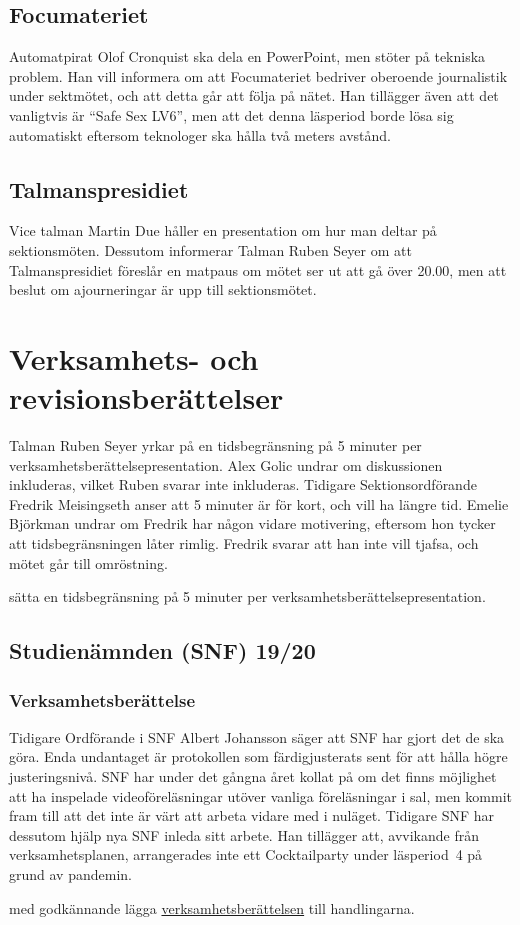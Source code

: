 \documentclass[hidelinks]{sektionsmote}
\begin{document}
\subsection{Focumateriet}
Automatpirat Olof Cronquist ska dela en PowerPoint, men stöter på tekniska problem.
Han vill informera om att Focumateriet bedriver oberoende journalistik under sektmötet, och att detta går att följa på nätet.
Han tillägger även att det vanligtvis är \enquote{Safe Sex LV6}, men att det denna läsperiod borde lösa sig automatiskt eftersom teknologer ska hålla två meters avstånd.

\subsection{Talmanspresidiet}
Vice talman Martin Due håller en presentation om hur man deltar på sektionsmöten.
Dessutom informerar Talman Ruben Seyer om att Talmanspresidiet föreslår en matpaus om mötet ser ut att gå över 20.00, men att beslut om ajourneringar är upp till sektionsmötet.


\section{Verksamhets- och revisionsberättelser}
Talman Ruben Seyer yrkar på en tidsbegränsning på 5 minuter per verksamhetsberättelsepresentation.
Alex Golic undrar om diskussionen inkluderas, vilket Ruben svarar inte inkluderas.
Tidigare Sektionsordförande Fredrik Meisingseth anser att 5 minuter är för kort, och vill ha längre tid.
Emelie Björkman undrar om Fredrik har någon vidare motivering, eftersom hon tycker att tidsbegränsningen låter rimlig.
Fredrik svarar att han inte vill tjafsa, och mötet går till omröstning.
\begin{beslut}
    \item sätta en tidsbegränsning på 5 minuter per verksamhetsberättelsepresentation.
\end{beslut}

\subsection{Studienämnden (SNF) 19/20}

\subsubsection{Verksamhetsberättelse}
Tidigare Ordförande i SNF Albert Johansson säger att SNF har gjort det de ska göra.
Enda undantaget är protokollen som färdigjusterats sent för att hålla högre justeringsnivå.
SNF har under det gångna året kollat på om det finns möjlighet att ha inspelade videoföreläsningar utöver vanliga föreläsningar i sal, men kommit fram till att det inte är värt att arbeta vidare med i nuläget.
Tidigare SNF har dessutom hjälp nya SNF inleda sitt arbete.
Han tillägger att, avvikande från verksamhetsplanen, arrangerades inte ett Cocktailparty under läsperiod~4 på grund av pandemin.
\begin{beslut}
    \item med godkännande lägga \hyperlink{bilagor/snf/vb.pdf.1}{verksamhetsberättelsen} till handlingarna.
\end{beslut}
\end{document}
